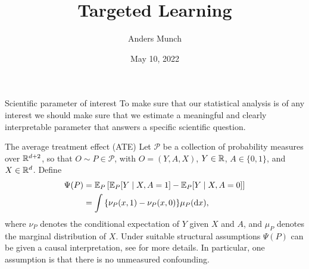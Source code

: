 \documentclass[handout]{beamer}\usepackage{listings}
\author{Anders Munch}
\date{May 10, 2022}
\title{Targeted Learning}
\begin{document}
\maketitle
\begin{frame}[label={sec:orgae5af2f}]{Scientific parameter of interest}
\small To make sure that our statistical analysis is of any interest we should make sure that we
estimate a meaningful and clearly interpretable parameter that answers a specific scientific
question.
\begin{exampleblock}{The average treatment effect (ATE)}
Let $\mathcal{P}$ be a collection of probability measures over $\mathbb{R}^{d+2}$, so that
$O \sim P \in \mathcal{P}$, with $O = (Y, A, X)$, $Y\in \mathbb{R}$, $A\in \{0,1\}$, and $X \in
\mathbb{R}^d$. Define
\begin{align*}
  \Psi(P)
  & = \operatorname{\mathbb{E}}_P{\left[ \operatorname{\mathbb{E}}_P[Y \mid X, A=1] - \operatorname{\mathbb{E}}_P[Y \mid X, A=0] \right]} \\
  & = \int {\left\{ \nu_P(x, 1) - \nu_P(x, 0) \right\}} \mu_P(\mathop{}\!\mathrm{d} x),
\end{align*}
where $\nu_P$ denotes the conditional expectation of $Y$ given $X$ and $A$, and $\mu_P$ denotes the
marginal distribution of $X$. 
Under suitable structural assumptions \(\Psi(P)\) can be given a causal interpretation, see
\citep{kennedy2016semiparametric,hernanRobinsWhatIf} for more details. In particular, one
assumption is that there is no unmeasured confounding.
\end{exampleblock}
\end{frame}
\end{document}
